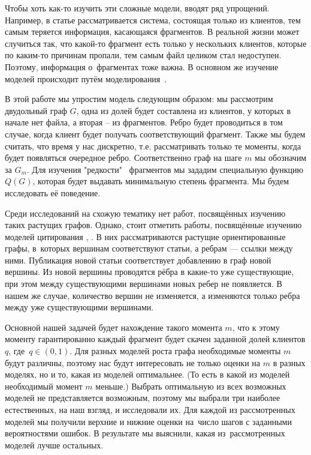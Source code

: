 \documentclass{matmex-diploma-custom}
\theoremstyle{named}
\begin{document}
Чтобы хоть как-то изучить эти сложные модели, вводят ряд упрощений.
Например, в статье \cite{cool} рассматривается система, состоящая только из клиентов, 
тем самым теряется информация, касающаяся фрагментов.
В реальной жизни может случиться так, что какой-то фрагмент есть только у нескольких клиентов, которые
по каким-то причинам пропали, тем самым файл целиком стал недоступен.
Поэтому, информация о~фрагментах тоже важна. 
В основном же изучение моделей происходит путём моделирования~\cite{unavalib}.


В этой работе мы упростим модель следующим образом: мы рассмотрим двудольный граф $G$, 
одна из долей будет составлена из клиентов, у которых в начале нет файла, а вторая -- из фрагментов. 
Ребро будет проводиться в том случае, когда клиент будет получать соответствующий фрагмент.
Также мы будем считать, что время у нас дискретно, т.е. рассматривать только те моменты, когда будет появляться очередное ребро.
Соответственно граф на шаге $m$ мы обозначим за $G_m$.
Для изучения "редкости" \ фрагментов мы зададим специальную функцию $Q(G)$, которая будет выдавать минимальную степень фрагмента.
Мы будем исследовать её поведение.

Среди исследований на схожую тематику нет работ, посвящённых изучению таких растущих графов.
Однако, стоит отметить работы, посвящённые изучению моделей цитирования \cite{price}, \cite{newman}. 
В них рассматриваются растущие ориентированные графы, в~которых вершинам соответствуют статьи, а ребрам --- ссылки между ними. 
Публикация новой статьи соответствует добавлению в граф новой вершины.
Из новой вершины проводятся рёбра в какие-то уже существующие, при этом между существующими вершинами новых ребер не появляется.
В нашем же случае, количество вершин не изменяется, а изменяются только ребра между уже существующими вершинами.

\newpage

Основной нашей задачей будет нахождение такого момента $m$, что к этому моменту гарантированно каждый фрагмент 
будет скачен заданной долей клиентов $q$, где~$q \in (0, 1)$. 
Для разных моделей роста графа необходимые моменты $m$ будут различны, 
поэтому нас будут интересовать не только оценки на $m$ в разных моделях, но и то, какая из моделей оптимальнее. 
(То есть в какой из моделей необходимый момент $m$ меньше.) 
Выбрать оптимальную из всех возможных моделей не представляется возможным, 
поэтому мы выбрали три наиболее естественных, на наш взгляд, и исследовали их. 
Для каждой из рассмотренных моделей мы получили верхние и нижние оценки на~число шагов с заданными вероятностями ошибок. 
В результате мы выяснили, какая из~рассмотренных моделей лучше остальных.
\end{document}
